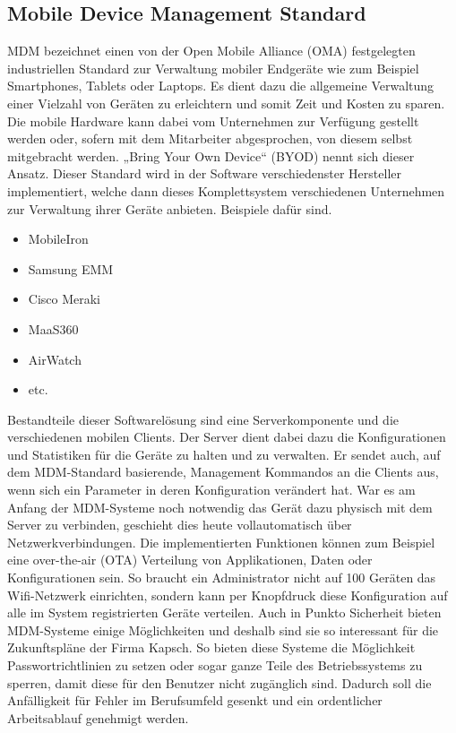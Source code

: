 \subsection{Mobile Device Management Standard}
MDM bezeichnet einen von der Open Mobile Alliance (OMA) festgelegten industriellen Standard zur Verwaltung mobiler Endgeräte wie zum Beispiel Smartphones, Tablets oder Laptops. Es dient dazu die allgemeine Verwaltung einer Vielzahl von Geräten zu erleichtern und somit Zeit und Kosten zu sparen. Die mobile Hardware kann dabei vom Unternehmen zur Verfügung gestellt werden oder, sofern mit dem Mitarbeiter abgesprochen, von diesem selbst mitgebracht werden. „Bring Your Own Device“ (BYOD) nennt sich dieser Ansatz. Dieser Standard wird in der Software verschiedenster Hersteller implementiert, welche dann dieses Komplettsystem verschiedenen Unternehmen zur Verwaltung ihrer Geräte anbieten. Beispiele dafür sind.
\begin{itemize}
	\item MobileIron
	\item Samsung EMM
	\item Cisco Meraki
	\item MaaS360
	\item AirWatch
	\item etc.
\end{itemize}
Bestandteile dieser Softwarelösung sind eine Serverkomponente und die verschiedenen mobilen Clients. Der Server dient dabei dazu die Konfigurationen und Statistiken für die Geräte zu halten und zu verwalten. Er sendet auch, auf dem MDM-Standard basierende, Management Kommandos an die Clients aus, wenn sich ein Parameter in deren Konfiguration verändert hat. War es am Anfang der MDM-Systeme noch notwendig das Gerät dazu physisch mit dem Server zu verbinden, geschieht dies heute vollautomatisch über Netzwerkverbindungen. Die implementierten Funktionen können zum Beispiel eine over-the-air (OTA) Verteilung von Applikationen, Daten oder Konfigurationen sein. So braucht ein Administrator nicht auf 100 Geräten das Wifi-Netzwerk einrichten, sondern kann per Knopfdruck diese Konfiguration auf alle im System registrierten Geräte verteilen.  Auch in Punkto Sicherheit bieten MDM-Systeme einige Möglichkeiten und deshalb sind sie so interessant für die Zukunftspläne der Firma Kapsch. So bieten diese Systeme die Möglichkeit Passwortrichtlinien zu setzen oder sogar ganze Teile des Betriebssystems zu sperren, damit diese für den Benutzer nicht zugänglich sind. Dadurch soll die Anfälligkeit für Fehler im Berufsumfeld gesenkt und ein ordentlicher Arbeitsablauf genehmigt werden.
